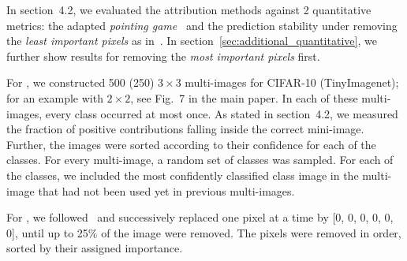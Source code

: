 In section~4.2, we evaluated the attribution methods against 2 quantitative 
metrics: 
 the adapted \emph{pointing game}~ and
 the prediction stability under removing the \emph{least important pixels} as in~. In section~\ref{sec:additional_quantitative}, we further show results for removing the \emph{most important pixels} first.

For , we constructed 500 (250) $3\times3$ multi-images for CIFAR-10 (TinyImagenet); for an example with $2\times2$, see Fig.~7 in the main paper.
In each of these multi-images, every class occurred at most once. As stated in section~4.2,
    we measured the fraction of positive contributions falling inside the correct mini-image. Further, the images were sorted according to their confidence for each of the classes. For every multi-image, a random set of classes was sampled. For each of the classes, we included the most confidently classified class image in the multi-image that had not been used yet in previous multi-images.

For , we followed~ and successively replaced one pixel at a time by [0, 0, 0, 0, 0, 0],
    until up to 25\% of the image were removed. The pixels were removed in order, sorted by their assigned importance.